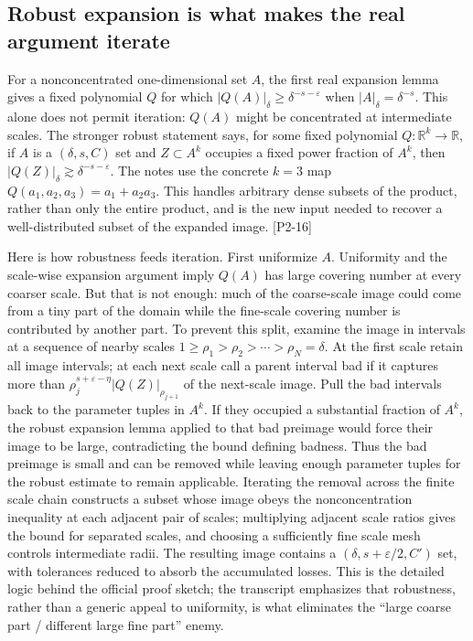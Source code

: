 \subsection{Robust expansion is what makes the real argument iterate}\label{04-visual-computing-ii-ch033-robust-expansion-is-what-makes-the-real-argument-iterate-1}

\hypertarget{04-visual-computing-ii-ch033-robust-expansion-is-what-makes-the-real-argument-iterate-1}{}

For a nonconcentrated one-dimensional set \(A\), the first real expansion lemma gives a fixed polynomial \(Q\) for which \(|Q(A)|_\delta\ge\delta^{-s-\varepsilon}\) when \(|A|_\delta=\delta^{-s}\). This alone does not permit iteration: \(Q(A)\) might be concentrated at intermediate scales. The stronger robust statement says, for some fixed polynomial \(Q:\mathbb R^k\to\mathbb R\), if \(A\) is a \((\delta,s,C)\) set and \(Z\subset A^k\) occupies a fixed power fraction of \(A^k\), then \(|Q(Z)|_\delta\gtrsim\delta^{-s-\varepsilon}\). The notes use the concrete \(k=3\) map \(Q(a_1,a_2,a_3)=a_1+a_2a_3\). This handles arbitrary dense subsets of the product, rather than only the entire product, and is the new input needed to recover a well-distributed subset of the expanded image. {[}P2-16{]}

Here is how robustness feeds iteration. First uniformize \(A\). Uniformity and the scale-wise expansion argument imply \(Q(A)\) has large covering number at every coarser scale. But that is not enough: much of the coarse-scale image could come from a tiny part of the domain while the fine-scale covering number is contributed by another part. To prevent this split, examine the image in intervals at a sequence of nearby scales \(1\ge\rho_1>\rho_2>\cdots>\rho_N=\delta\). At the first scale retain all image intervals; at each next scale call a parent interval bad if it captures more than \(\rho_j^{s+\varepsilon-\eta}|Q(Z)|_{\rho_{j+1}}\) of the next-scale image. Pull the bad intervals back to the parameter tuples in \(A^k\). If they occupied a substantial fraction of \(A^k\), the robust expansion lemma applied to that bad preimage would force their image to be large, contradicting the bound defining badness. Thus the bad preimage is small and can be removed while leaving enough parameter tuples for the robust estimate to remain applicable. Iterating the removal across the finite scale chain constructs a subset whose image obeys the nonconcentration inequality at each adjacent pair of scales; multiplying adjacent scale ratios gives the bound for separated scales, and choosing a sufficiently fine scale mesh controls intermediate radii. The resulting image contains a \((\delta,s+\varepsilon/2,C')\) set, with tolerances reduced to absorb the accumulated losses. This is the detailed logic behind the official proof sketch; the transcript emphasizes that robustness, rather than a generic appeal to uniformity, is what eliminates the ``large coarse part / different large fine part'' enemy.

